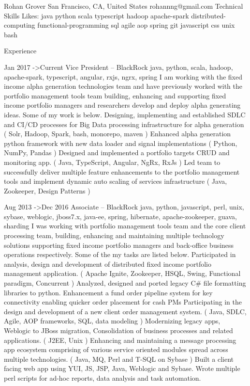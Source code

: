 \documentclass{article}
\begin{document}
 

Rohan Grover
San Francisco, CA, United States rohannng@gmail.com
Technical Skills
Likes: java python scala typescript hadoop apache-spark distributed-computing functional-programming sql agile aop spring git javascript css unix bash


Experience


Jan 2017 ->Current Vice President – BlackRock
java, python, scala, hadoop, apache-spark, typescript, angular, rxjs, ngrx, spring
I am working with the fixed income alpha generation technologies team and have previously worked with the portfolio management tools team building,
enhancing and supporting fixed income portfolio managers and researchers develop and deploy alpha generating ideas. Some of my work is below.
Designing, implementing and established SDLC and CI/CD processes for Big Data processing infrastructure for alpha generation ( Solr, Hadoop, Spark,
bash, monorepo, maven )
Enhanced alpha generation python framework with new data loader and signal implementations ( Python, NumPy, Pandas )
Designed and implemented a portfolio targets CRUD and monitoring app. ( Java, TypeScript, Angular, NgRx, RxJs )
Led team to successfully deliver multiple feature enhancements to the portfolio management tools and implement dynamic auto scaling of services
infrastructure ( Java, Zookeeper, Design Patterns )


Aug 2013 ->Dec 2016 Associate – BlackRock
java, python, javascript, perl, unix, sybase, weblogic, jboss7.x, java-ee, spring, hibernate, apache-zookeeper, guava, sharding
I was working with portfolio management tools team and the core client processing team, building, enhancing and maintaining multiple technology solutions
supporting fixed income portfolio managers and back-office business operations respectively. Some of the my tasks are listed below.
Participated in analysis, design and development of distributed fixed income portfolio management application. ( Apache Ignite, Zookeeper, HSQL,
Swing, Functional paradigm, Concurrent )
Analyzed, designed and ported legacy C\# file formatting libraries to python.
Enhancement a fund order pipeline system for key connectivity enabling quicker order placement for cash PMs
Participating in the design and development of a new client order management system. ( Java, SDLC, Agile, AOP frameworks, SQL, data modeling )
Modernizing legacy apps, Weblogic to JBoss migration, Consolidation of business processes and related applications. ( J2EE, Unix )
Enhancing and maintaining a message processing app ecosystem comprising of various service oriented modules spread across multiple technologies. (
Java, MQ, Perl and T-SQL on Sybase )
Built a client facing web app using YUI, JS, JSP, Java, Weblogic and Sybase.
Wrote multiple perl scripts for ad-hoc reports, data analysis and task automation.
\end{document}
